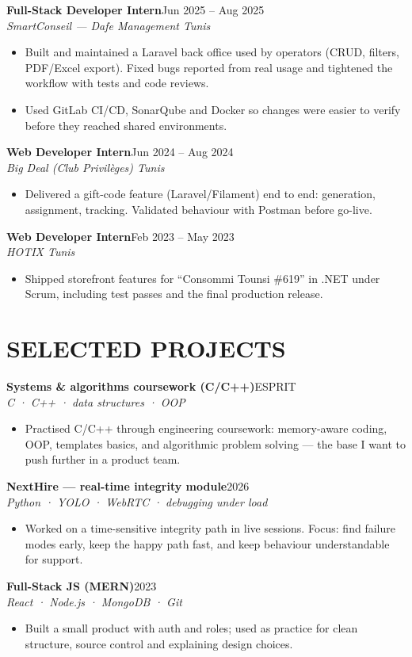 \documentclass[10pt,a4paper]{article}
\newcommand{\job}[3]{%
  \textbf{\color{primary}#1}\hfill{\color{muted}\small #2}\\[-1pt]
  {\color{accent}\textit{#3}}\\[2pt]
  \begin{itemize}[leftmargin=0.85em, itemsep=1pt, topsep=0pt, parsep=0pt, partopsep=0pt]
}
\newcommand{\proj}[3]{%
  \textbf{\color{primary}#1}\hfill{\color{muted}\small #2}\\[-1pt]
  {\color{accent}\textit{#3}}\\[1pt]
  \begin{itemize}[leftmargin=0.85em, itemsep=1pt, topsep=0pt, parsep=0pt, partopsep=0pt]
}
\begin{document}
\job{Full-Stack Developer Intern}{Jun 2025 -- Aug 2025}{SmartConseil — Dafe Management \textbar{} Tunis}
  \item Built and maintained a Laravel back office used by operators (CRUD, filters, PDF/Excel export). Fixed bugs reported from real usage and tightened the workflow with tests and code reviews.
  \item Used GitLab CI/CD, SonarQube and Docker so changes were easier to verify before they reached shared environments.
\end{itemize}

\job{Web Developer Intern}{Jun 2024 -- Aug 2024}{Big Deal (Club Privilèges) \textbar{} Tunis}
  \item Delivered a gift-code feature (Laravel/Filament) end to end: generation, assignment, tracking. Validated behaviour with Postman before go-live.
\end{itemize}

\job{Web Developer Intern}{Feb 2023 -- May 2023}{HOTIX \textbar{} Tunis}
  \item Shipped storefront features for ``Consommi Tounsi \#619'' in .NET under Scrum, including test passes and the final production release.
\end{itemize}

\section{SELECTED PROJECTS}
{\footnotesize
\setlength{\parskip}{1pt}

\proj{Systems \& algorithms coursework (C/C++)}{ESPRIT}{C · C++ · data structures · OOP}
  \item Practised C/C++ through engineering coursework: memory-aware coding, OOP, templates basics, and algorithmic problem solving — the base I want to push further in a product team.
\end{itemize}

\proj{NextHire — real-time integrity module}{2026}{Python · YOLO · WebRTC · debugging under load}
  \item Worked on a time-sensitive integrity path in live sessions. Focus: find failure modes early, keep the happy path fast, and keep behaviour understandable for support.
\end{itemize}

\proj{Full-Stack JS (MERN)}{2023}{React · Node.js · MongoDB · Git}
  \item Built a small product with auth and roles; used as practice for clean structure, source control and explaining design choices.
\end{itemize}
}
\end{document}
